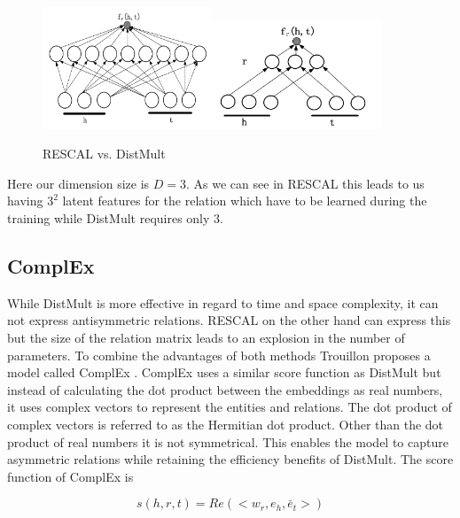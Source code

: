 \begin{figure}[H]
\centering
\includegraphics[width=0.45\textwidth]{images/rescal.png}\includegraphics[width=0.45\textwidth]{images/distmult.png}
\caption{RESCAL vs. DistMult}
\label{fig:rescal_distmult}
\end{figure}

Here our dimension size is $D=3$. As we can see in RESCAL this leads to us having $3^2$ latent features for the relation which have to be learned during the training while DistMult requires only $3$.

\subsection{ComplEx}
\label{cha:complex}
While DistMult is more effective in regard to time and space complexity, it can not express antisymmetric relations. RESCAL on the other hand can express this but the size of the relation matrix leads to an explosion in the number of parameters. 
To combine the advantages of both methods Trouillon proposes a model called ComplEx  \cite{trouillon_complex_2016}. ComplEx uses a similar score function as DistMult but instead of calculating the dot product between the embeddings as real numbers, it uses complex vectors to represent the entities and relations. The dot product of complex vectors is referred to as the Hermitian dot product. Other than the dot product of real numbers it is not symmetrical. This enables the model to capture asymmetric relations while retaining the efficiency benefits of DistMult. The score function of ComplEx is 

\begin{equation}
\label{score_complex}
s(h,r,t)=Re(<w_r,e_h,\bar{e}_t>)
\end{equation}

